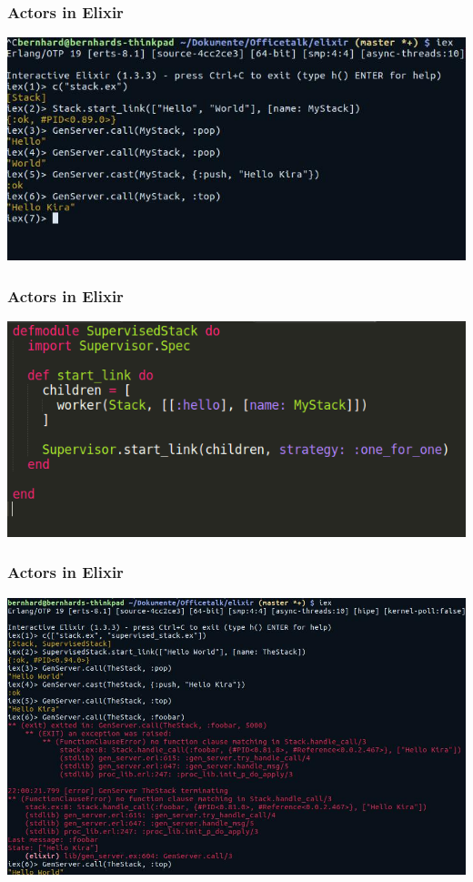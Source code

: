 \documentclass{beamer}
\begin{document}

\begin{frame}
\frametitle{Actors in Elixir}
\includegraphics[width=1\linewidth]{./images/elixir_stack_terminal.jpg}
\end{frame}


\begin{frame}
\frametitle{Actors in Elixir}
\includegraphics[width=1\linewidth]{./images/elixir_stack_supervisor.png}
\end{frame}


\begin{frame}
\frametitle{Actors in Elixir}
\includegraphics[width=0.95\linewidth]{./images/elixir_stack_supervisor_terminal.jpg}
\end{frame}
\end{document}
